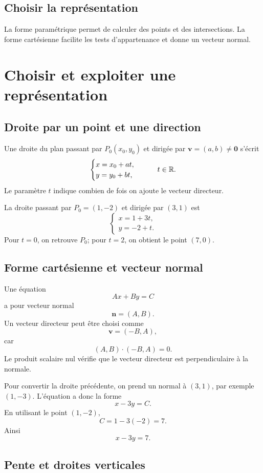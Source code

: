\subsection{Choisir la représentation}
La forme paramétrique permet de calculer des points et des intersections. La forme cartésienne facilite les tests d'appartenance et donne un vecteur normal.

\section{Choisir et exploiter une représentation}
\label{manual:section:10.07}

\subsection{Droite par un point et une direction}

Une droite du plan passant par $P_0(x_0,y_0)$ et dirigée par $\mathbf v=(a,b)\neq\mathbf0$ s'écrit
\[
\begin{cases}
x=x_0+at,\\y=y_0+bt,
\end{cases}
\qquad t\in\mathbb{R}.
\]
Le paramètre $t$ indique combien de fois on ajoute le vecteur directeur.

\begin{examplebox}
La droite passant par $P_0=(1,-2)$ et dirigée par $(3,1)$ est
\[
\begin{cases}
x=1+3t,\\y=-2+t.
\end{cases}
\]
Pour $t=0$, on retrouve $P_0$; pour $t=2$, on obtient le point $(7,0)$.
\end{examplebox}

\subsection{Forme cartésienne et vecteur normal}

Une équation
\[
Ax+By=C
\]
a pour vecteur normal
\[
\mathbf n=(A,B).
\]
Un vecteur directeur peut être choisi comme
\[
\mathbf v=(-B,A),
\]
car
\[
(A,B)\cdot(-B,A)=0.
\]
Le produit scalaire nul vérifie que le vecteur directeur est perpendiculaire à la normale.

Pour convertir la droite précédente, on prend un normal à $(3,1)$, par exemple $(1,-3)$. L'équation a donc la forme
\[
x-3y=C.
\]
En utilisant le point $(1,-2)$,
\[
C=1-3(-2)=7.
\]
Ainsi
\[
x-3y=7.
\]

\subsection{Pente et droites verticales}


